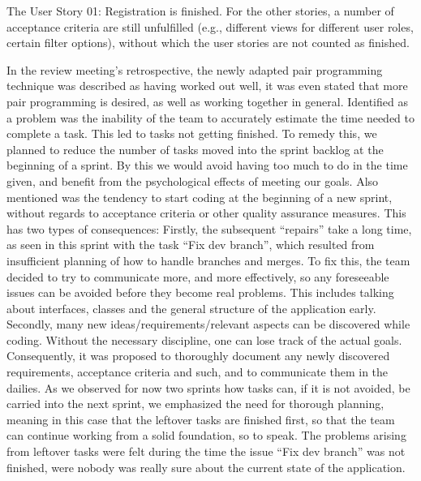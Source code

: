 The User Story 01: Registration is finished. For the other stories, a number of acceptance criteria are still unfulfilled (e.g., different views for different user roles, certain filter options), without which the user stories are not counted as finished.

In the review meeting’s retrospective, the newly adapted pair programming technique was described as having worked out well, it was even stated that more pair programming is desired, as well as working together in general. Identified as a problem was the inability of the team to accurately estimate the time needed to complete a task. This led to tasks not getting finished. To remedy this, we planned to reduce the number of tasks moved into the sprint backlog at the beginning of a sprint. By this we would avoid having too much to do in the time given, and benefit from the psychological effects of meeting our goals. Also mentioned was the tendency to start coding at the beginning of a new sprint, without regards to acceptance criteria or other quality assurance measures. This has two types of consequences: Firstly, the subsequent “repairs” take a long time, as seen in this sprint with the task “Fix dev branch”, which resulted from insufficient planning of how to handle branches and merges. To fix this, the team decided to try to communicate more, and more effectively, so any foreseeable issues can be avoided before they become real problems. This includes talking about interfaces, classes and the general structure of the application early. Secondly, many new ideas/requirements/relevant aspects can be discovered while coding. Without the necessary discipline, one can lose track of the actual goals. Consequently, it was proposed to thoroughly document any newly discovered requirements, acceptance criteria and such, and to communicate them in the dailies. As we observed for now two sprints how tasks can, if it is not avoided, be carried into the next sprint, we emphasized the need for thorough planning, meaning in this case that the leftover tasks are finished first, so that the team can continue working from a solid foundation, so to speak. The problems arising from leftover tasks were felt during the time the issue “Fix dev branch” was not finished, were nobody was really sure about the current state of the application.
